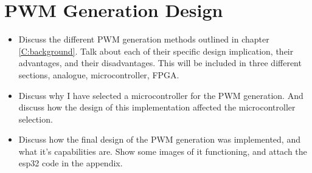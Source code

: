 \section{PWM Generation Design}

\begin{itemize}

    \item 
    Discuss the different PWM generation methods outlined in chapter \ref{C:background}. Talk about each of their specific design implication, their advantages, and their disadvantages. This will be included in three different sections, analogue, microcontroller, FPGA. 

    \item 
    Discuss why I have selected a microcontroller for the PWM generation. And discuss how the design of this implementation affected the microcontroller selection. 

    \item 
    Discuss how the final design of the PWM generation was implemented, and what it's capabilities are. Show some images of it functioning, and attach the esp32 code in the appendix.

\end{itemize}